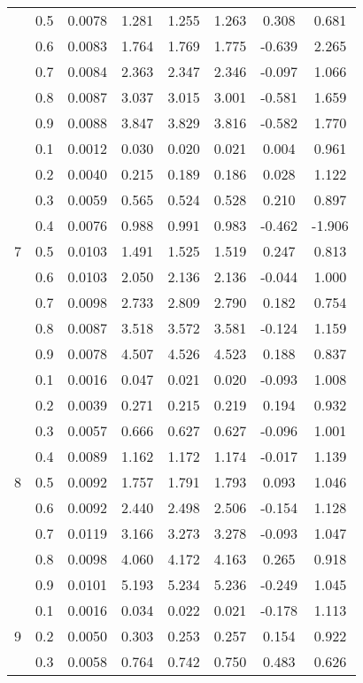 \documentclass[11pt,a4paper]{report}
\begin{document}
\begin{longtable}{ | c | c || c | c | c | c | c | c | }
 & 0.5 & 0.0078 & 1.281 & 1.255 & 1.263 & 0.308 & 0.681 \\
 & 0.6 & 0.0083 & 1.764 & 1.769 & 1.775 & -0.639 & 2.265 \\
 & 0.7 & 0.0084 & 2.363 & 2.347 & 2.346 & -0.097 & 1.066 \\
 & 0.8 & 0.0087 & 3.037 & 3.015 & 3.001 & -0.581 & 1.659 \\
 & 0.9 & 0.0088 & 3.847 & 3.829 & 3.816 & -0.582 & 1.770 \\
 \hline
\multirow{9}{*}{7} & 0.1 & 0.0012 & 0.030 & 0.020 & 0.021 & 0.004 & 0.961 \\
 & 0.2 & 0.0040 & 0.215 & 0.189 & 0.186 & 0.028 & 1.122 \\
 & 0.3 & 0.0059 & 0.565 & 0.524 & 0.528 & 0.210 & 0.897 \\
 & 0.4 & 0.0076 & 0.988 & 0.991 & 0.983 & -0.462 & -1.906 \\
 & 0.5 & 0.0103 & 1.491 & 1.525 & 1.519 & 0.247 & 0.813 \\
 & 0.6 & 0.0103 & 2.050 & 2.136 & 2.136 & -0.044 & 1.000 \\
 & 0.7 & 0.0098 & 2.733 & 2.809 & 2.790 & 0.182 & 0.754 \\
 & 0.8 & 0.0087 & 3.518 & 3.572 & 3.581 & -0.124 & 1.159 \\
 & 0.9 & 0.0078 & 4.507 & 4.526 & 4.523 & 0.188 & 0.837 \\
 \hline
\multirow{9}{*}{8} & 0.1 & 0.0016 & 0.047 & 0.021 & 0.020 & -0.093 & 1.008 \\
 & 0.2 & 0.0039 & 0.271 & 0.215 & 0.219 & 0.194 & 0.932 \\
 & 0.3 & 0.0057 & 0.666 & 0.627 & 0.627 & -0.096 & 1.001 \\
 & 0.4 & 0.0089 & 1.162 & 1.172 & 1.174 & -0.017 & 1.139 \\
 & 0.5 & 0.0092 & 1.757 & 1.791 & 1.793 & 0.093 & 1.046 \\
 & 0.6 & 0.0092 & 2.440 & 2.498 & 2.506 & -0.154 & 1.128 \\
 & 0.7 & 0.0119 & 3.166 & 3.273 & 3.278 & -0.093 & 1.047 \\
 & 0.8 & 0.0098 & 4.060 & 4.172 & 4.163 & 0.265 & 0.918 \\
 & 0.9 & 0.0101 & 5.193 & 5.234 & 5.236 & -0.249 & 1.045 \\
 \hline
\multirow{9}{*}{9} & 0.1 & 0.0016 & 0.034 & 0.022 & 0.021 & -0.178 & 1.113 \\
 & 0.2 & 0.0050 & 0.303 & 0.253 & 0.257 & 0.154 & 0.922 \\
 & 0.3 & 0.0058 & 0.764 & 0.742 & 0.750 & 0.483 & 0.626 \\

\end{longtable}
\end{document}
